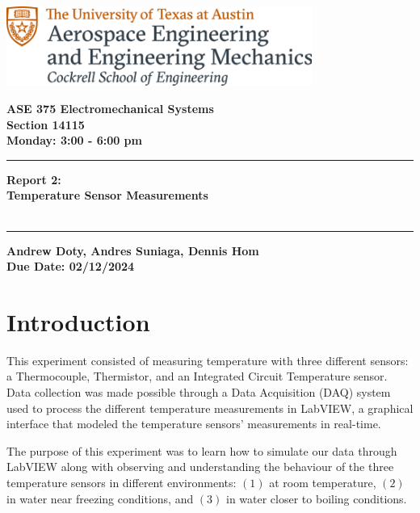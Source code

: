 \documentclass{article}
\begin{document}
\begin{titlepage}
  \centering
  \includegraphics[width=10cm]{ase-logo-formal.png}  %
  \vspace{1cm}  %
 
  \Large \textbf{ASE 375 Electromechanical Systems}\\
  \large \textbf{Section 14115}\\
  \vspace{0.5cm}
  \textbf{Monday: 3:00 - 6:00 pm}\\
 
  \vspace{1cm}
 
  \hrule
  \vspace{0.5cm}
 
  \Huge \textbf{Report 2:\\
  Temperature Sensor Measurements}\\
  \Huge \textbf{}\\
 
  \vspace{0.5cm}
  \hrule
 
  \vspace{1cm}
 
  \normalsize \textbf{Andrew Doty, Andres Suniaga, Dennis Hom}\\
  \normalsize \textbf{Due Date: 02/12/2024}
 
\end{titlepage}
\newpage

\tableofcontents
\thispagestyle{empty}
\newpage

\section{Introduction}
This experiment consisted of measuring temperature with three different sensors: a Thermocouple, Thermistor, and an Integrated Circuit Temperature sensor. Data collection was made possible through a Data Acquisition (DAQ) system used to process the different temperature measurements in LabVIEW, a graphical interface that modeled the temperature sensors' measurements in real-time. 

The purpose of this experiment was to learn how to simulate our data through LabVIEW along with observing and understanding the behaviour of the three temperature sensors in different environments: $(1)$ at room temperature, $(2)$ in water near freezing conditions, and $(3)$ in water closer to boiling conditions. 
\end{document}
